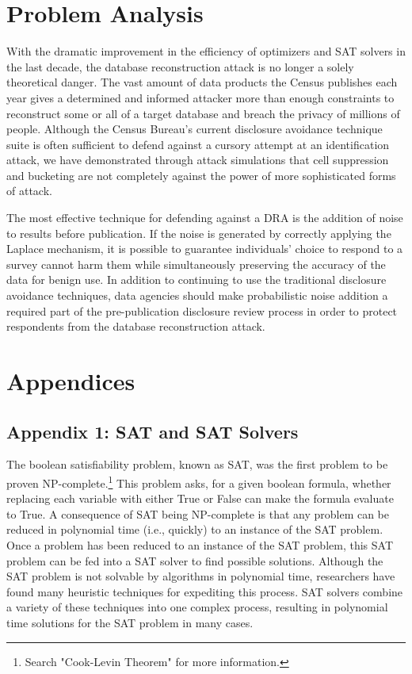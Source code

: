 \documentclass[jou,apacite]{apa6}
\begin{document}
\section{Problem Analysis}

With the dramatic improvement in the efficiency of optimizers and SAT solvers in the last decade, the database reconstruction attack is no longer a solely theoretical danger. The vast amount of data products the Census publishes each year gives a determined and informed attacker more than enough constraints to reconstruct some or all of a target database and breach the privacy of millions of people. Although the Census Bureau's current disclosure avoidance technique suite is often sufficient to defend against a cursory attempt at an identification attack, we have demonstrated through attack simulations that cell suppression and bucketing are not completely against the power of more sophisticated forms of attack.

The most effective technique for defending against a DRA is the addition of noise to results before publication. If the noise is generated by correctly applying the Laplace mechanism, it is possible to guarantee individuals' choice to respond to a survey cannot harm them while simultaneously preserving the accuracy of the data for benign use. In addition to continuing to use the traditional disclosure avoidance techniques, data agencies should make probabilistic noise addition a required part of the pre-publication disclosure review process in order to protect respondents from the database reconstruction attack.

\section{Appendices}

\subsection{Appendix 1: SAT and SAT Solvers}

The boolean satisfiability problem, known as SAT, was the first problem to be proven NP-complete.\footnote{Search "Cook-Levin Theorem" for more information.} This problem asks, for a given boolean formula, whether replacing each variable with either True or False can make the formula evaluate to True.   A consequence of SAT being NP-complete is that any problem can be reduced in polynomial time (i.e., quickly) to an instance of the SAT problem. Once a problem has been reduced to an instance of the SAT problem, this SAT problem can be fed into a SAT solver to find possible solutions. Although the SAT problem is not solvable by algorithms in polynomial time, researchers have found many heuristic techniques for expediting this process. SAT solvers combine a variety of these techniques into one complex process, resulting in polynomial time solutions for the SAT problem in many cases.
\end{document}
